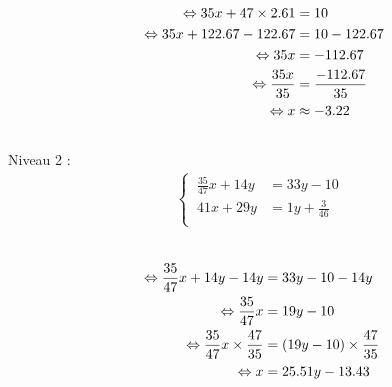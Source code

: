 \documentclass{article}%
\begin{document}
\ \\%
\vspace{5mm}%
\newline%
\begin{align*}%
\ \Leftrightarrow  35x + 47 \times 2.61 &= 10 \\%
\vspace{5mm}%
\newline%
\ \Leftrightarrow  35x + 122.67 -122.67 &= 10 - 122.67 \\%
\vspace{5mm}%
\newline%
\ \Leftrightarrow  35x  &= -112.67 \\%
\vspace{5mm}%
\newline%
\ \Leftrightarrow  \frac{35x}{35} &= \frac{-112.67}{35}\\%
\vspace{5mm}%
\newline%
\ \Leftrightarrow  x &\approx -3.22 \\%
\vspace{5mm}%
\newline%
\end{align*}%
Niveau 2 :%
\begin{align*}%
\begin{cases}%
\  \frac{35}{47}x + 14y &= 33y - 10 \\%
\  41x + 29y &= 1y + \frac{3}{46} \\%
\end{cases}%
\\%
\end{align*}%
\ \\%
\vspace{5mm}%
\newline%
\begin{align*}%
\  \Leftrightarrow  \frac{35}{47}x + 14y - 14y &= 33y - 10 - 14y \\%
\vspace{5mm}%
\newline%
\  \Leftrightarrow  \frac{35}{47}x &= 19y - 10 \\%
\vspace{5mm}%
\newline%
\  \Leftrightarrow  \frac{35}{47}x \times \frac{47}{35} &= (19y - 10) \times \frac{47}{35} \\%
\vspace{5mm}%
\newline%
\  \Leftrightarrow  x &= 25.51y - 13.43\\%
\vspace{5mm}%
\newline%
\end{align*}%
\end{document}
